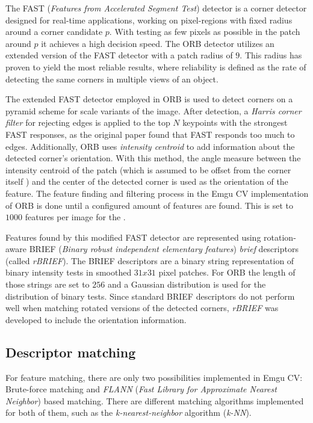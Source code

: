 The FAST (\emph{Features from Accelerated Segment Test}) detector \cite{fast} is a corner detector designed for real-time applications, working on pixel-regions with fixed radius around a corner candidate $p$. With testing as few pixels as possible in the patch around $p$ it achieves a high decision speed. \cite{fast} The ORB detector utilizes an extended version of the FAST detector with a patch radius of $9$. This radius has proven to yield the most reliable results, where reliability is defined as the rate of detecting the same corners in multiple views of an object. \cite{fast, orb}

The extended FAST detector employed in ORB is used to detect corners on a pyramid scheme for scale variants \cite{scale_pyramids} of the image.  After detection, a \emph{Harris corner filter} \cite{harris_corner} for rejecting edges is applied to the top $N$ keypoints with the strongest FAST responses, as the original paper found that FAST responds too much to edges.\cite{orb} Additionally, ORB uses \emph{intensity centroid} \cite{intensity_centroids} to add information about the detected corner's orientation. With this method, the angle measure between the intensity centroid of the patch (which is assumed to be offset from the corner itself \cite{intensity_centroids}) and the center of the detected corner is used as the orientation of the feature. The feature finding and filtering process in the Emgu CV implementation of ORB is done until a configured amount of features are found. This is set to $1000$ features per image for the \vd.

Features found by this modified FAST detector are represented using rotation-aware BRIEF (\emph{Binary robust independent elementary features}) \emph{brief} descriptors (called \emph{rBRIEF}). The BRIEF descriptors are a binary string representation of binary intensity tests in smoothed $31 x 31$ pixel patches. For ORB the length of those strings are set to $256$ and a Gaussian distribution is used for the distribution of binary tests. Since standard BRIEF descriptors do not perform well when matching rotated versions of the detected corners, \emph{rBRIEF} was developed to include the orientation information. \cite{brief, orb}

\subsection{Descriptor matching}\label{sec:tech-bg:subsec:descriptor-matching}

For feature matching, there are only two possibilities implemented in Emgu CV: Brute-force matching and \emph{FLANN} (\emph{Fast Library for Approximate Nearest Neighbor}) based matching. There are different matching algorithms implemented for both of them, such as the \emph{k-nearest-neighbor} algorithm (\emph{k-NN}).

